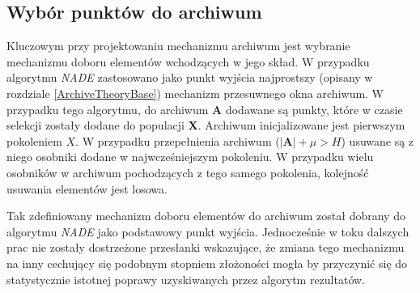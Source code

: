 \documentclass[12pt,a4paper]{report}
\begin{document}
{{{{{{{\subsection{Wybór punktów do archiwum}
\par{
Kluczowym przy projektowaniu mechanizmu archiwum jest wybranie mechanizmu doboru elementów wchodzących w jego skład.
W przypadku algorytmu \emph{NADE} zastosowano jako punkt wyjścia najprostszy (opisany w rozdziale \ref{ArchiveTheoryBase}) mechanizm przesuwnego okna archiwum. W przypadku tego algorytmu, do archiwum $\mathbf{A}$ dodawane są punkty, które w czasie selekcji zostały dodane do populacji $\mathbf{X
}$. Archiwum inicjalizowane jest pierwszym pokoleniem $X$. W przypadku przepełnienia archiwum ($|\mathbf{A}| + \mu > H$) usuwane są z niego osobniki dodane w najwcześniejszym pokoleniu. W przypadku wielu osobników w archiwum pochodzących z tego samego pokolenia, kolejność usuwania elementów jest losowa.
}
\par
Tak zdefiniowany mechanizm doboru elementów do archiwum został dobrany do algorytmu \emph{NADE} jako podstawowy punkt wyjścia. Jednocześnie w toku dalszych prac nie zostały dostrzeżone przesłanki wskazujące, że zmiana tego mechanizmu na inny cechujący się podobnym stopniem złożoności mogła by przyczynić się do statystycznie istotnej poprawy uzyskiwanych przez algorytm rezultatów.
}
}}}}}}
\end{document}
